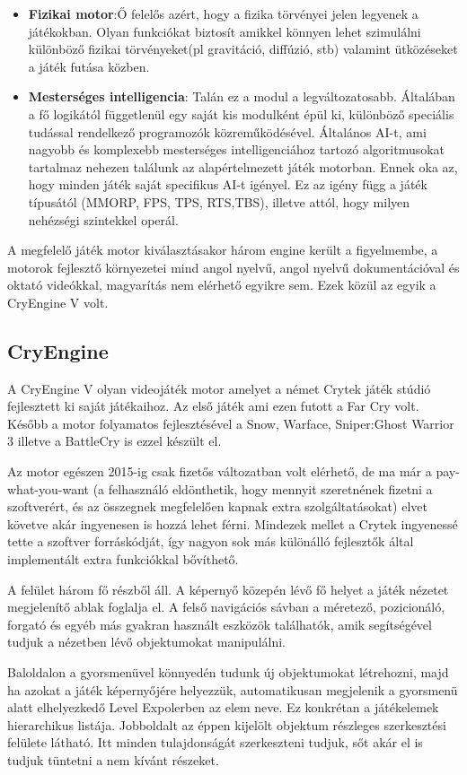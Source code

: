 \documentclass[colorlinks]{thesis-ekf}
\theoremstyle{definition}
\theoremstyle{remark}
\begin{document}
\begin{itemize}
	\item \textbf{Fizikai motor}:Ő felelős azért, hogy a fizika törvényei jelen legyenek a játékokban. Olyan funkciókat biztosít amikkel könnyen lehet szimulálni különböző fizikai törvényeket(pl gravitáció, diffúzió, stb) valamint ütközéseket a játék futása közben.\cite{wiki_game_engine}
	\item \textbf{Mesterséges intelligencia}: Talán ez a modul a legváltozatosabb. Általában a fő logikától függetlenül egy saját kis modulként épül ki, különböző speciális tudással rendelkező programozók közreműködésével. Általános AI-t, ami nagyobb és komplexebb mesterséges intelligenciához tartozó algoritmusokat tartalmaz nehezen találunk az alapértelmezett játék motorban. Ennek oka az, hogy minden játék saját specifikus AI-t igényel. Ez az igény függ a játék típusától (MMORP, FPS, TPS, RTS,TBS), illetve attól, hogy milyen nehézségi szintekkel operál. 
\end{itemize}
A megfelelő játék motor kiválasztásakor három engine került a figyelmembe, a motorok fejlesztő környezetei mind angol nyelvű, angol nyelvű dokumentációval és oktató videókkal, magyarítás nem elérhető egyikre sem. Ezek közül az egyik a CryEngine V volt.
\subsection{CryEngine}
A CryEngine V olyan videojáték motor amelyet a német Crytek játék stúdió fejlesztett ki saját játékaihoz. Az első játék ami ezen futott a Far Cry volt. Később a motor folyamatos fejlesztésével a Snow, Warface, Sniper:Ghost Warrior 3 illetve a BattleCry is ezzel készült el. \cite{cry_wiki}

Az motor egészen 2015-ig csak fizetős változatban volt elérhető, de ma már a pay-what-you-want (a felhasználó eldönthetik, hogy mennyit szeretnének fizetni a szoftverért, és az összegnek megfelelően kapnak extra szolgáltatásokat) elvet követve akár ingyenesen is hozzá lehet férni. Mindezek mellet a Crytek ingyenessé tette a szoftver forráskódját, így nagyon sok más különálló fejlesztők által implementált extra funkciókkal bővíthető.

A felület három fő részből áll. A képernyő közepén lévő fő helyet a játék nézetet megjelenítő ablak foglalja el. A felső navigációs sávban a méretező, pozicionáló, forgató és egyéb más gyakran használt eszközök találhatók, amik segítségével tudjuk a nézetben lévő objektumokat manipulálni.

Baloldalon a gyorsmenüvel könnyedén tudunk új objektumokat létrehozni, majd ha azokat a játék képernyőjére helyezzük, automatikusan megjelenik a gyorsmenü alatt elhelyezkedő Level Expolerben az elem neve. Ez konkrétan a játékelemek hierarchikus listája. Jobboldalt az éppen kijelölt objektum részleges szerkesztési felülete látható. Itt minden tulajdonságát szerkeszteni tudjuk, sőt akár el is tudjuk tüntetni a nem kívánt részeket.
\end{document}
